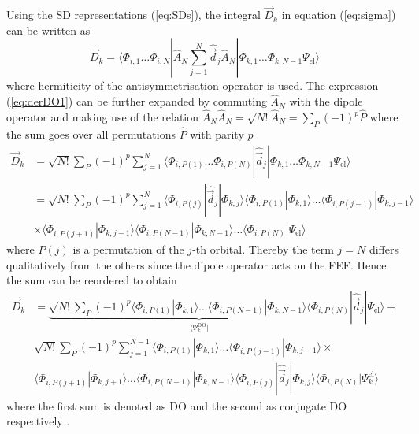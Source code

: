 {Using the SD representations (\ref{eq:SDs}), the integral $\vec{D}_k$ in equation (\ref{eq:sigma}) can be written as
\begin{equation} \label{eq:derDO1}
\vec{D}_k = \langle
\Phi_{i,1}  \hdots\Phi_{i,N} | \hat{A}_N \sum_{j=1}^N\hat{\vec{d}}_j \hat{A}_N |
\Phi_{k,1}\hdots\Phi_{k,N-1} \Psi_\text{el} 
\rangle 
\end{equation}
where hermiticity of the antisymmetrisation operator is used.
The expression (\ref{eq:derDO1}) can be further expanded by commuting $\hat{A}_N$ with the dipole operator and making use of the relation $\hat{A}_N\hat{A}_N=\sqrt{N!}\hat{A}_N=\sum_P (-1)^p \hat{P}$ where the sum goes over all permutations $\hat{P}$ with parity $p$
\begin{align} \label{eq:derDO2}
\vec{D}_k & = \sqrt{N!}\sum_P (-1)^p \sum_{j=1}^N \langle
\Phi_{i,P(1)}\hdots\Phi_{i,P(N)} |\hat{\vec{d}}_j |
\Phi_{k,1}\hdots\Phi_{k,N-1} \Psi_\text{el}  \rangle  \\
  & = \sqrt{N!}\sum_P (-1)^p \sum_{j=1}^N 
  \langle \Phi_{i,P(j)} | \hat{\vec{d}}_j | \Phi_{k,j} \rangle
          \langle \Phi_{i,P(1)}  |\Phi_{k,1}   \rangle
  \hdots  \langle \Phi_{i,P(j-1)}|\Phi_{k,j-1} \rangle \\
  & \times\langle \Phi_{i,P(j+1)}|\Phi_{k,j+1} \rangle
          \langle \Phi_{i,P(N-1)}|\Phi_{k,N-1} \rangle
  \hdots  \langle \Phi_{i,P(N)}  |\Psi_\text{el}\rangle 
\end{align}
where $P(j)$ is a permutation of the $j$-th orbital.
Thereby the term $j=N$ differs qualitatively from the others since the dipole operator acts on the FEF.
Hence the sum can be reordered to obtain
\begin{align} \label{eq:fullDO}
  \vec{D}_k & = 
  \underbrace{\sqrt{N!}\sum_P (-1)^p 
          \langle \Phi_{i,P(1)}  |\Phi_{k,1}    \rangle
  \hdots  \langle \Phi_{i,P(N-1)}|\Phi_{k,N-1}  \rangle
  \langle \Phi_{i,P(N)} }_{\langle \Psi_k^\text{DO}|} | \hat{\vec{d}}_j | \Psi_\text{el} \rangle + \nonumber \\
  & 
       \sqrt{N!}\sum_P (-1)^p \sum_{j=1}^{N-1} 
          \langle \Phi_{i,P(1)}  |\Phi_{k,1}    \rangle
  \hdots  \langle \Phi_{i,P(j-1)}|\Phi_{k,j-1}  \rangle \times \nonumber \\
  &       \langle \Phi_{i,P(j+1)}|\Phi_{k,j+1}  \rangle
  \hdots  \langle \Phi_{i,P(N-1)}|\Phi_{k,N-1}  \rangle
 \langle \Phi_{i,P(j)}|\hat{\vec{d}}_j |\Phi_{k,j}\rangle
  \langle \Phi_{i,P(N)}| \Psi_k^\text{el} \rangle
\end{align}
where the first sum is denoted as DO and the second as conjugate DO respectively \cite{saPonzi}.
}
